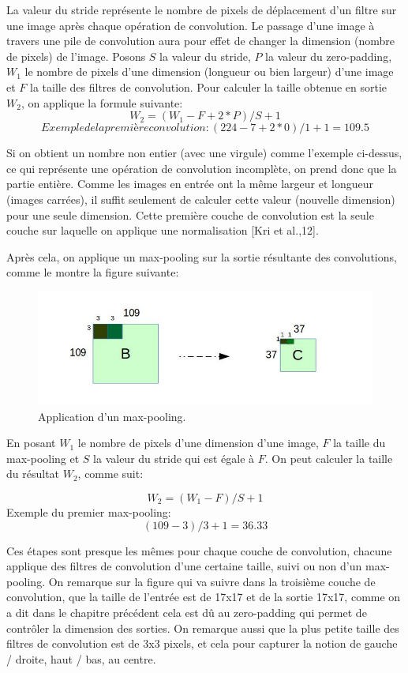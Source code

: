 	La valeur du stride représente le nombre de pixels de déplacement d'un filtre sur une image après chaque opération de convolution. Le passage d'une image à travers une pile de convolution aura pour effet de changer la dimension (nombre de pixels) de l'image. Posons $S$ la valeur du stride, $P$ la valeur du zero-padding, $W_{1}$ le nombre de pixels d'une dimension (longueur ou bien largeur) d'une image et $F$ la taille des filtres de convolution. Pour calculer la taille obtenue en sortie $W_{2}$, on applique la formule suivante:
$$W_{2} = (W_{1} - F + 2*P)/S + 1$$
$$Exemple de la première convolution: (224 - 7 + 2*0)/1 +1 = 109.5$$
	
	Si on obtient un nombre non entier (avec une virgule) comme l'exemple ci-dessus, ce qui représente une opération de convolution incomplète, on prend donc que la partie entière. Comme les images en entrée ont la même largeur et longueur (images carrées), il suffit seulement de calculer cette valeur (nouvelle dimension) pour une seule dimension.
	Cette première couche de convolution est la seule couche sur laquelle on applique une normalisation [Kri et al.,12].
	
	Après cela, on applique un max-pooling sur la sortie résultante des convolutions, comme le montre la figure suivante:

\begin{figure}[H]
	\centering
		\includegraphics[width=7in]{Figures/pool.jpg}
	\caption[An Electron]{Application d'un max-pooling.}
	\label{fig:Electron}
\end{figure}

	En posant $W_{1}$ le nombre de pixels d'une dimension d'une image, $F$ la taille du max-pooling et $S$ la valeur du stride qui est égale à $F$. On peut calculer la taille du résultat $W_{2}$, comme suit:

$$W_{2} = (W_{1} - F )/S + 1$$
Exemple du premier max-pooling: $$(109 - 3)/3 +1 = 36.33$$

	Ces étapes sont presque les mêmes pour chaque couche de convolution, chacune applique des filtres de convolution d'une certaine taille, suivi ou non d'un max-pooling. On remarque sur la figure qui va suivre dans la troisième couche de convolution, que la taille de l'entrée est de 17x17 et de la sortie 17x17, comme on a dit dans le chapitre précédent cela est dû au zero-padding qui permet de contrôler la dimension des sorties. On remarque aussi que la plus petite taille des filtres de convolution est de 3x3 pixels, et cela pour capturer la notion de gauche / droite, haut / bas, au centre.

